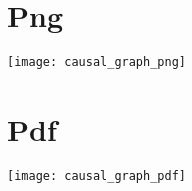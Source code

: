 \documentclass{article}
\begin{document}
\section{Png}
\begin{center}
\texttt{[image: causal\_graph\_png]}
\end{center}

\section{Pdf}
\begin{center}
\texttt{[image: causal\_graph\_pdf]}
\end{center}
\end{document}
